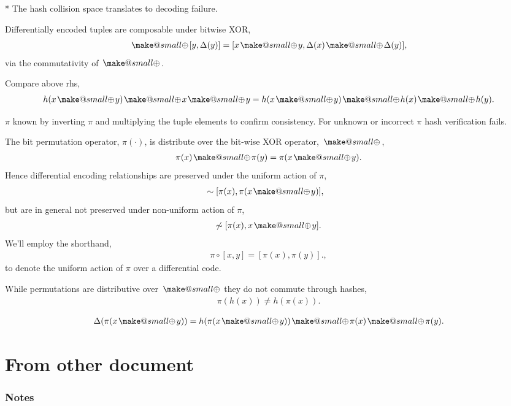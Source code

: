 \documentclass[twocolumn, aps, amsmath, amssymb, nofootinbib, superscriptaddress, longbibliography, doublefloatfix, table-of-contents, eqsecnum, rmp]{revtex4-2}
\makeatletter
\newcommand{\soplus}{{{\hspace{1pt}}{\mathbin{\mathpalette\make@small{\mathbin\oplus}}}}{\hspace{1pt}}}
\newcommand{\make@small}[2]{%
  \vcenter{\hbox{%
    \scalebox{0.6}{$\m@th#1#2$}%
  }}%
}
\makeatother
\begin{document}
* The hash collision space translates to decoding failure.

Differentially encoded tuples are composable under bitwise XOR,
\begin{align}
	[x,\Delta(x)] \soplus [y,\Delta(y)] = [x\soplus y, \Delta(x)\soplus \Delta(y)],
\end{align}
via the commutativity of $\soplus$.

Compare above rhs,
\begin{align}
	h(x\soplus y) \soplus x \soplus y = h(x \soplus y) \soplus h(x) \soplus h(y).
\end{align}

$\pi$ known by inverting $\pi$ and multiplying the tuple elements to confirm consistency. For unknown or incorrect $\pi$ hash verification fails.

The bit permutation operator, $\pi(\cdot)$, is distribute over the bit-wise XOR operator, $\soplus$,
\begin{align}
	\pi(x)\soplus \pi(y) = \pi(x\soplus y).
\end{align}
Hence differential encoding relationships are preserved under the uniform action of $\pi$,
\begin{align}
	[x,x\soplus y] &\sim [\pi(x), \pi(x\soplus y)],
\end{align}
but are in general not preserved under non-uniform action of $\pi$,
\begin{align}
	[x,x\soplus y] \not\sim [\pi(x), x\soplus y].
\end{align}
We'll employ the shorthand,
\begin{align}
	\pi\circ[x,y] = [\pi(x),\pi(y)].,
\end{align}
to denote the uniform action of $\pi$ over a differential code.

While permutations are distributive over $\soplus$ they do not commute through hashes,
\begin{align}
	\pi(h(x)) \neq h(\pi(x)).	
\end{align}

\begin{align}
	\Delta(\pi(x\soplus y)) = h(\pi(x\soplus y)) \soplus \pi(x) \soplus \pi(y).
\end{align}

\section{From other document}

\subsubsection{Notes}
\end{document}
